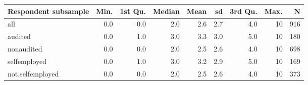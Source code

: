 \begin{table}[ht]
\centering
\begin{tabular}{lrrrrrrrr}
  \hline
Respondent subsample & Min. & 1st Qu. & Median & Mean & sd & 3rd Qu. & Max. & N \\ 
  \hline
all & 0.0 & 0.0 & 2.0 & 2.6 & 2.7 & 4.0 & 10 & 916 \\ 
  audited & 0.0 & 1.0 & 3.0 & 3.3 & 3.0 & 5.0 & 10 & 180 \\ 
  nonaudited & 0.0 & 0.0 & 2.0 & 2.5 & 2.6 & 4.0 & 10 & 698 \\ 
  selfemployed & 0.0 & 1.0 & 3.0 & 3.2 & 2.9 & 5.0 & 10 & 169 \\ 
  not.selfemployed & 0.0 & 0.0 & 2.0 & 2.5 & 2.6 & 4.0 & 10 & 373 \\ 
   \hline
\end{tabular}
\end{table}
